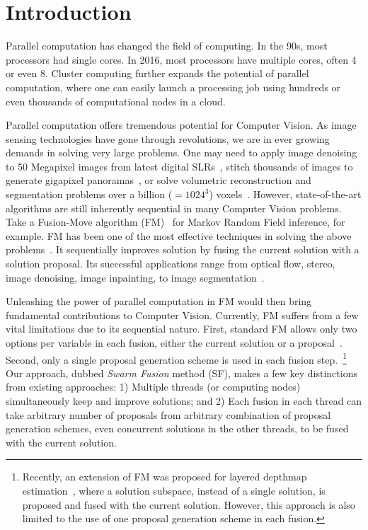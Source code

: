\section{Introduction}
Parallel computation has changed the field of computing.  In the 90s,
most processors had single cores. In 2016, most processors have multiple
cores, often 4 or even 8. Cluster computing further expands the
potential of parallel computation, where one can easily launch a
processing job using hundreds or even thousands of computational nodes
in a cloud.


Parallel computation offers tremendous potential for Computer Vision. As
image sensing technologies have gone through revolutions, we are in
ever growing demands in solving very large problems. One may need to
apply image denoising to 50 Megapixel images from latest digital
SLRs~\cite{canon?}, stitch thousands of images to generate gigapixel
panoramas~\cite{gigapan}, or solve volumetric reconstruction and
segmentation problems over a billion ($=1024^3$)
voxels~\cite{Joint3DSceneReconstructionandclassSegmentation}.
%
However, state-of-the-art algorithms are still inherently sequential in
many Computer Vision problems. Take a Fusion-Move algorithm
(FM)~\cite{viktor,second_order_stereo,else} for Markov Random Field
inference, for example. FM has been one of the most effective techniques
in solving the above
problems~\cite{fusion_moves_for_markov_random_field_optimization}.
%
It sequentially improves solution by fusing the current solution with a
solution proposal. Its successful applications range from optical flow,
stereo, image denoising, image inpainting, to image
segmentation~\cite{fusion_moves_for_markov_random_field_optimization}.


Unleashing the power of parallel computation in FM
would then bring fundamental contributions to Computer
Vision. Currently, FM suffers from a few vital limitations due to its
sequential nature. First, standard FM allows only two options per
variable in each fusion, either the current solution or a
proposal~\cite{fusion_moves_for_markov_random_field_optimization}. Second,
only a single proposal generation scheme is used in each fusion
step.~\footnote{Recently, an extension of FM was proposed for layered
depthmap estimation~\cite{chen_2016}, where a solution subspace, instead
of a single solution, is proposed and fused with the current
solution. However, this approach is also limited to the use of one proposal
generation scheme in each fusion.}
%
Our approach, dubbed {\it Swarm Fusion} method (SF), makes a
few key distinctions from existing approaches: 1) Multiple threads (or
computing nodes) simultaneously keep and improve solutions; and 2) Each
fusion in each thread can take arbitrary number of proposals from
arbitrary combination of proposal generation schemes, even concurrent
solutions in the other threads, to be fused with the current solution.
%


